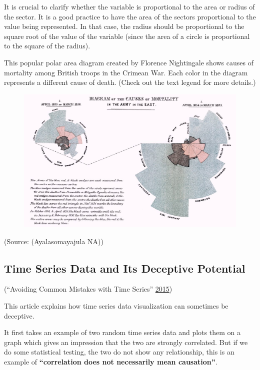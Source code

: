 \documentclass[]{book}
\begin{document}
It is crucial to clarify whether the variable is proportional to the
area or radius of the sector. It is a good practice to have the area of
the sectors proportional to the value being represented. In that case,
the radius should be proportional to the square root of the value of the
variable (since the area of a circle is proportional to the square of
the radius).

This popular polar area diagram created by Florence Nightingale shows
causes of mortality among British troops in the Crimean War. Each color
in the diagram represents a different cause of death. (Check out the
text legend for more details.)

\begin{figure}
\centering
\includegraphics{images/aya-polar.jpg}
\caption{}
\end{figure}

(Source: (Ayalasomayajula NA))

\subsection{Time Series Data and Its Deceptive
Potential}\label{time-series-data-and-its-deceptive-potential}

(``Avoiding Common Mistakes with Time Series''
\protect\hyperlink{ref-TimeSeries}{2015})

This article explains how time series data visualization can sometimes
be deceptive.

It first takes an example of two random time series data and plots them
on a graph which gives an impression that the two are strongly
correlated. But if we do some statistical testing, the two do not show
any relationship, this is an example of \textbf{``correlation does not
necessarily mean causation''}.
\end{document}
